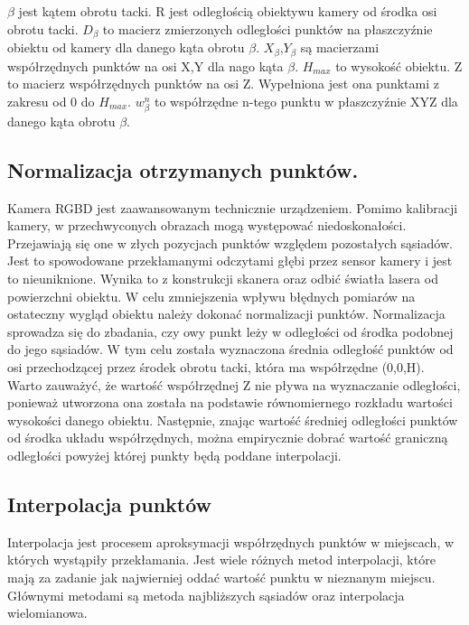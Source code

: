 $\beta$ jest kątem obrotu tacki. R jest odległością obiektywu kamery od środka osi obrotu tacki. $D_{\beta}$ to macierz zmierzonych odległości punktów na płaszczyźnie obiektu od kamery dla danego kąta obrotu $\beta$. $X_{\beta}$,$Y_{\beta}$ są macierzami współrzędnych punktów na osi X,Y dla nago kąta $\beta$. $H_{max}$ to wysokość obiektu. Z to macierz współrzędnych punktów na osi Z. Wypełniona jest ona punktami z zakresu od 0 do $H_{max}$. $w_{\beta}^n$ to współrzędne n-tego punktu w płaszczyźnie XYZ dla danego kąta obrotu $\beta$.

\subsection{Normalizacja otrzymanych punktów.}
Kamera RGBD jest zaawansowanym technicznie urządzeniem. Pomimo kalibracji kamery, w przechwyconych obrazach mogą występować niedoskonałości. Przejawiają się one w złych pozycjach punktów względem pozostałych sąsiadów. Jest to spowodowane przekłamanymi odczytami głębi przez sensor kamery i jest to nieuniknione. Wynika to z konstrukcji skanera oraz odbić światła lasera od powierzchni obiektu. W celu zmniejszenia wpływu błędnych pomiarów na ostateczny wygląd obiektu należy dokonać normalizacji punktów. Normalizacja sprowadza się do zbadania, czy owy punkt leży w odległości od środka podobnej do jego sąsiadów. W tym celu została wyznaczona średnia odległość punktów od osi przechodzącej przez środek obrotu tacki, która ma współrzędne (0,0,H). Warto zauważyć, że wartość współrzędnej Z nie pływa na wyznaczanie odległości, ponieważ utworzona ona została na podstawie równomiernego rozkładu wartości wysokości danego obiektu. Następnie, znając wartość średniej odległości punktów od środka układu współrzędnych, można empirycznie dobrać wartość graniczną odległości powyżej której punkty będą poddane interpolacji.

\subsection{Interpolacja punktów}
Interpolacja jest procesem aproksymacji współrzędnych punktów w miejscach, w których wystąpiły przekłamania. Jest wiele różnych metod interpolacji, które mają za zadanie jak najwierniej oddać wartość punktu w nieznanym miejscu. Głównymi metodami są metoda najbliższych sąsiadów oraz interpolacja wielomianowa.

